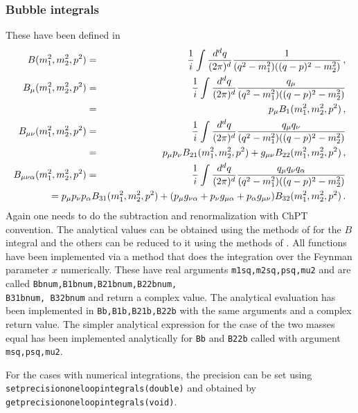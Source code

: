 \documentclass[12pt,a4paper]{article}
\begin{document}
\subsubsection{Bubble integrals}
\label{bubble}

These have been defined in \cite{Amoros:1999dp,Bijnens:2002hp}
\begin{eqnarray}
B(m_1^2,m_2^2,p^2) &=& \frac{1}{i}\int 
\frac{d^dq}{(2\pi)^d} \frac{1}{(q^2-m_1^2)((q-p)^2-m_2^2)}\,,\nonumber\\
B_\mu(m_1^2,m_2^2,p^2) &=& \frac{1}{i}\int 
\frac{d^dq}{(2\pi)^d} \frac{q_\mu}{(q^2-m_1^2)((q-p)^2-m_2^2)}\nonumber\\
&=& p_\mu B_1(m_1^2,m_2^2,p^2)\,,\nonumber\\
B_{\mu\nu}(m_1^2,m_2^2,p^2) &=& \frac{1}{i}\int 
\frac{d^dq}{(2\pi)^d} \frac{q_\mu q_\nu}{(q^2-m_1^2)((q-p)^2-m_2^2)}\nonumber\\
&=& p_\mu p_\nu B_{21}(m_1^2,m_2^2,p^2)+g_{\mu \nu} B_{22}(m_1^2,m_2^2,p^2)\,,\nonumber\\
B_{\mu\nu\alpha}(m_1^2,m_2^2,p^2) &=& \frac{1}{i}\int 
\frac{d^dq}{(2\pi)^d} \frac{q_\mu q_\nu q_\alpha}{(q^2-m_1^2)((q-p)^2-m_2^2)}\nonumber\\
&& \hspace{-2cm}
= p_\mu p_\nu p_\alpha B_{31}(m_1^2,m_2^2,p^2) + 
(p_\mu g_{\nu \alpha} + p_\nu g_{\mu \alpha} + p_\alpha g_{\mu \nu})B_{32}(m_1^2,m_2^2,p^2)
\,.
\end{eqnarray}
Again one needs to do the subtraction and renormalization with ChPT convention.
The analytical values can be obtained using the methods
of \cite{'tHooft:1978xw} for the $B$ integral and the others can be reduced
to it using the methods of \cite{Passarino:1978jh}.
All functions have been implemented via a method that does the integration
over the Feynman parameter $x$ numerically.
These have real arguments \texttt{m1sq,m2sq,psq,mu2} and are called
\texttt{Bbnum,B1bnum,B21bnum,B22bnum,}\\ \texttt{B31bnum, B32bnum} and return a complex
value. The analytical evaluation has been implemented
in \texttt{Bb,B1b,B21b,B22b} with the same arguments and a complex
return value. The simpler analytical expression for the case of the
two masses equal has been implemented analytically for \texttt{Bb} and
\texttt{B22b} called
with argument \texttt{msq,psq,mu2}.

For the cases with numerical integrations, the precision can be set
using\\\texttt{setprecisiononeloopintegrals(double)} and
obtained by\\ \texttt{getprecisiononeloopintegrals(void)}.
\end{document}
